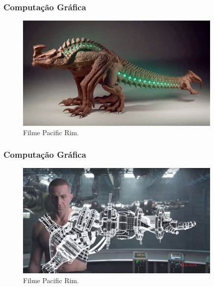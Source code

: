 \documentclass{beamer}
\begin{document}
\begin{frame}
\frametitle{Computação Gráfica}
	
	\begin{figure}[!h]
		\begin{center}
			\includegraphics[width=0.9\textwidth]{Figures/pr1}
			\caption{Filme Pacific Rim.}
		\end{center}
		
	\end{figure}
	

\end{frame}





\begin{frame}
\frametitle{Computação Gráfica}
	
	\begin{figure}[!h]
		\begin{center}
			\includegraphics[width=0.9\textwidth]{Figures/pr2}
			\caption{Filme Pacific Rim.}
		\end{center}
		
	\end{figure}
	

\end{frame}
\end{document}
